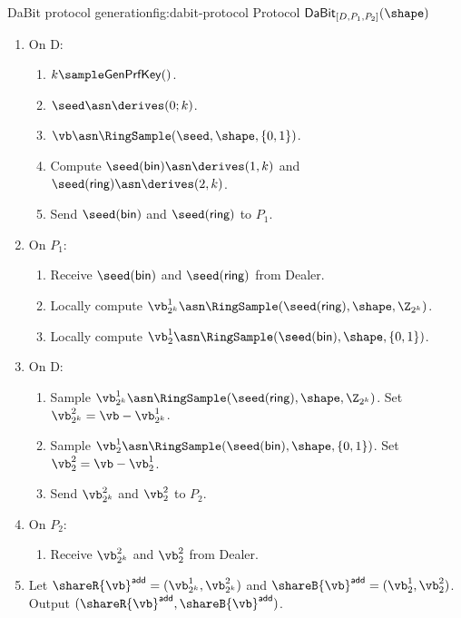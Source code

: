 \begin{Boxfig}{DaBit protocol generation}{fig:dabit-protocol}
  {Protocol $\mathsf{DaBit}_{[D, P_1, P_2]}(\shape)$}
  \begin{enumerate}
  \item On D:
  \begin{enumerate}
    \item $k \sample \mathsf{GenPrfKey}()$.
    \item $\seed \asn \derives(0; k)$.
    \item $\vb \asn \RingSample(\seed, \shape, \{0, 1\})$.
    \item Compute $\seed(\textsf{bin}) \asn \derives(1, k)$ and $\seed(\textsf{ring}) \asn \derives(2, k)$.
    \item Send $\seed(\textsf{bin})$ and $\seed(\textsf{ring})$ to $P_1$.

  \end{enumerate}
  \item On $P_1$:
 \begin{enumerate}
     \item Receive $\seed(\textsf{bin})$ and $\seed(\textsf{ring})$ from Dealer.
     \item Locally compute $\vb^1_{2^k} \asn \RingSample(\seed(\textsf{ring}), \shape, \Z_{2^k})$.
     \item Locally compute $\vb^1_{2} \asn \RingSample(\seed(\textsf{bin}), \shape, \{0, 1\})$.
 \end{enumerate}
\item On D:
\begin{enumerate}
    \item Sample $\vb^1_{2^k} \asn \RingSample(\seed(\textsf{ring}), \shape, \Z_{2^k})$. Set $\vb^2_{2^k} = \vb - \vb^1_{2^k}$.
    \item Sample $\vb^1_{2} \asn \RingSample(\seed(\textsf{bin}), \shape, \{0, 1\})$. Set $\vb^2_{2} = \vb - \vb^1_{2}$.
    \item Send $\vb^2_{2^k}$ and $\vb^2_2$ to $P_2$.
\end{enumerate}
\item On $P_2$:
\begin{enumerate}
    \item Receive $\vb^2_{2^k}$ and $\vb^2_2$ from Dealer.
\end{enumerate}
\item Let $\shareR{\vb}^\mathsf{add} = (\vb^1_{2^k}, \vb^2_{2^k})$ and $\shareB{\vb}^\mathsf{add} = (\vb^1_2, \vb^2_2)$. Output $(\shareR{\vb}^\mathsf{add}, \shareB{\vb}^\mathsf{add})$.
\end{enumerate}
\end{Boxfig}

